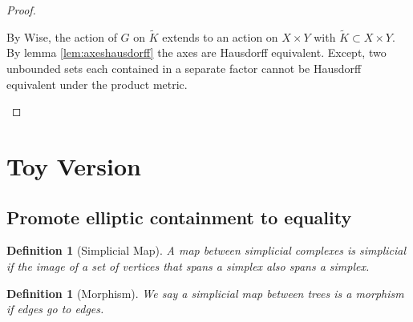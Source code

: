 \documentclass{article}
\theoremstyle{mystyle}
\newtheorem{pro}[thm]{Proposition}
\newtheorem{defn}[thm]{Definition}
\theoremstyle{remark}
\begin{document}
\begin{proof}
\begin{itemize}
    
    By Wise, the action of $G$ on $\widetilde{K}$ extends to an action on $X \times Y$ with $\widetilde{K}\subset X\times Y$. By lemma \ref{lem:axeshausdorff} the axes are Hausdorff equivalent. Except, two unbounded sets each contained in a separate factor cannot be Hausdorff equivalent under the product metric.
    
\end{itemize}
\end{proof}



\section{Toy Version}
\subsection{Promote elliptic containment to equality}



\begin{defn}
    [Simplicial Map]
    A map between simplicial complexes is simplicial if the image of a set of vertices that spans a simplex also spans a simplex.
\end{defn}

\begin{defn}
    [Morphism]
    We say a simplicial map between trees is a morphism if edges go to edges.
\end{defn}

\end{document}
